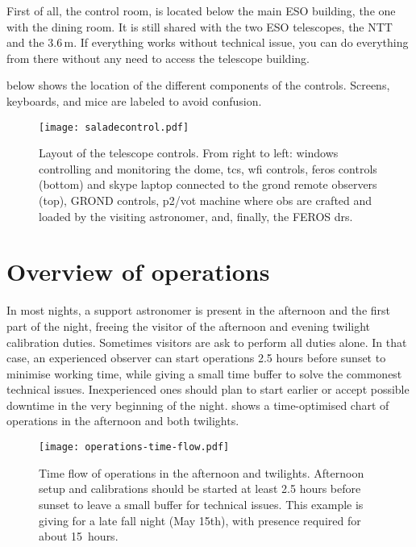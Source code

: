 \documentclass[11pt,fleqn,a4paper]{book}
\begin{document}
First of all, the \gls{control room}, is located below the main ESO building, the one with the dining room.  It is still shared with the two ESO telescopes, the NTT and the 3.6\,m. If everything works without technical issue, you can do everything from there without any need to access the telescope building.

  below shows the location of the different components of the controls.  Screens, keyboards, and mice are labeled to avoid confusion.

\begin{figure}[!ht] \texttt{[image: saladecontrol.pdf]}
\caption[Layout of the telescope controls]{Layout of the telescope controls.  From right to left: \gls{windows} 
controlling and monitoring the \gls{dome}, \acrlong{tcs}, \acrshort{wfi} controls,
\acrshort{feros} controls (bottom) and skype laptop connected to the \acrshort{grond} remote observers (top), GROND controls, \acrshort{p2}/\acrshort{vot} machine where
\acrshort{ob}s are crafted and loaded by the visiting astronomer, and,
finally, the FEROS \acrlong{drs}.}
\label{fig:saladecontrol} 
\end{figure}

\section{Overview of operations}

In most nights, a support astronomer is present in the afternoon and the first part of the night, freeing the \gls{visitor} of the afternoon and evening twilight calibration duties.  Sometimes visitors are ask to perform all duties alone.  In that case, an experienced observer can start operations 2.5 hours before sunset to minimise working time, while giving a small time buffer to solve the commonest technical issues.  Inexperienced ones should plan to start earlier or accept possible downtime in the very beginning of the night.  shows a time-optimised chart of operations in the afternoon and both twilights.

\begin{figure}[!ht]
\texttt{[image: operations-time-flow.pdf]}
\caption[Time flow of afternoon and twilight observations]{Time flow of operations in the afternoon and twilights. Afternoon setup and calibrations should be started at least 2.5 hours before sunset to leave a small buffer for technical issues. This example is giving for a late fall night (May 15th), with presence required for about 15~hours.}
\label{fig:timeflow}
\end{figure}
\end{document}
